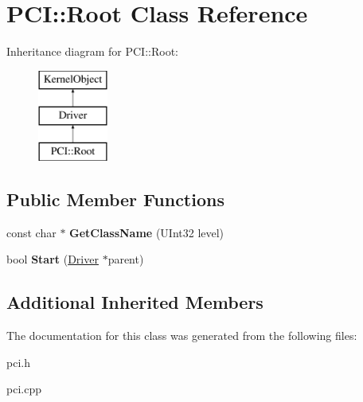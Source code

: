 \hypertarget{class_p_c_i_1_1_root}{}\section{P\+CI\+:\+:Root Class Reference}
\label{class_p_c_i_1_1_root}
Inheritance diagram for P\+CI\+:\+:Root\+:\begin{figure}[H]
\begin{center}
\leavevmode
\includegraphics[height=3.000000cm]{class_p_c_i_1_1_root}
\end{center}
\end{figure}
\subsection*{Public Member Functions}
\begin{DoxyCompactItemize}
\item 
\mbox{\label{class_p_c_i_1_1_root_a8ef3d7c0dbb1f75034e36ccbef6e9df3}} 
const char $\ast$ {\bfseries Get\+Class\+Name} (U\+Int32 level)
\item 
\mbox{\label{class_p_c_i_1_1_root_aa2242334bac3f55dcf293358e7a323da}} 
bool {\bfseries Start} (\hyperlink{class_driver}{Driver} $\ast$parent)
\end{DoxyCompactItemize}
\subsection*{Additional Inherited Members}


The documentation for this class was generated from the following files\+:\begin{DoxyCompactItemize}
\item 
pci.\+h\item 
pci.\+cpp\end{DoxyCompactItemize}
